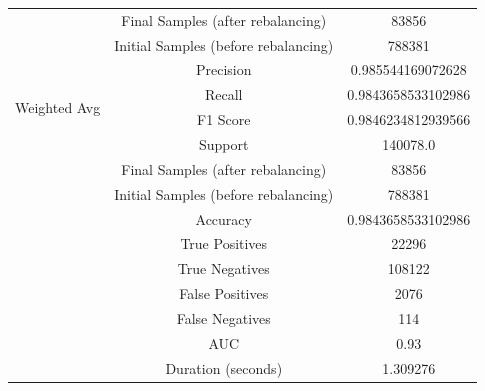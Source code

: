 \begin{longtable}{|c|c|c|}
 & Final Samples (after rebalancing) & 83856 \\
 & Initial Samples (before rebalancing) & 788381 \\
\hline
\multirow{4}{*}{Weighted Avg} & Precision & 0.985544169072628 \\
 & Recall & 0.9843658533102986 \\
 & F1 Score & 0.9846234812939566 \\
 & Support & 140078.0 \\
 & Final Samples (after rebalancing) & 83856 \\
 & Initial Samples (before rebalancing) & 788381 \\
\hline
& Accuracy & 0.9843658533102986 \\ \hline
& True Positives & 22296 \\ \hline
& True Negatives & 108122 \\ \hline
& False Positives & 2076 \\ \hline
& False Negatives & 114 \\ \hline
& AUC & 0.93 \\ \hline
& Duration (seconds) & 1.309276 \\ \hline
\end{longtable}


